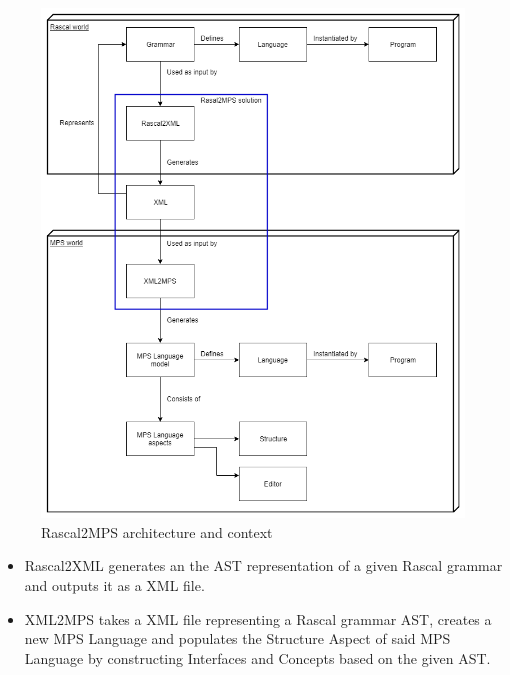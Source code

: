\documentclass[a4paper, 11pt]{article}
\begin{document}
\begin{figure}[h]
	\centering
	\includegraphics[scale=0.4]{images/World_Definition.png}
	\caption{Rascal2MPS architecture and context}
	\label{fig:world}
\end{figure}

\begin{itemize}
	\item Rascal2XML generates an the AST representation of a given Rascal grammar and outputs it as a XML file. 
	\item XML2MPS takes a XML file representing a Rascal grammar AST, creates a new MPS Language and populates the Structure Aspect of said MPS Language by constructing Interfaces and Concepts based on the given AST.  
\end{itemize}
\end{document}
